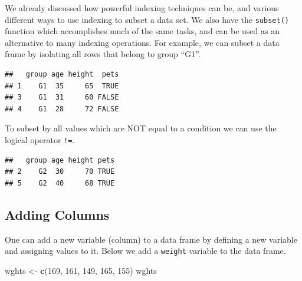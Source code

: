 \documentclass[
]{book}
\newenvironment{Shaded}{\begin{snugshade}}{\end{snugshade}}
\newcommand{\DecValTok}[1]{\textcolor[rgb]{0.00,0.00,0.81}{#1}}
\newcommand{\KeywordTok}[1]{\textcolor[rgb]{0.13,0.29,0.53}{\textbf{#1}}}
\newcommand{\NormalTok}[1]{#1}
\newcommand{\OperatorTok}[1]{\textcolor[rgb]{0.81,0.36,0.00}{\textbf{#1}}}
\newcommand{\StringTok}[1]{\textcolor[rgb]{0.31,0.60,0.02}{#1}}
\begin{document}
We already discussed how powerful indexing techniques can be, and various different ways to use indexing to subset a data set. We also have the \texttt{subset()} function which accomplishes much of the same tasks, and can be used as an alternative to many indexing operations. For example, we can subset a data frame by isolating all rows that belong to group ``G1''.

\begin{Shaded}
\end{Shaded}

\begin{verbatim}
##   group age height  pets
## 1    G1  35     65  TRUE
## 3    G1  31     60 FALSE
## 4    G1  28     72 FALSE
\end{verbatim}

To subset by all values which are NOT equal to a condition we can use the logical operator \texttt{!=}.

\begin{Shaded}
\end{Shaded}

\begin{verbatim}
##   group age height pets
## 2    G2  30     70 TRUE
## 5    G2  40     68 TRUE
\end{verbatim}

\hypertarget{adding-columns}{%
\subsection*{Adding Columns}\label{adding-columns}}

One can add a new variable (column) to a data frame by defining a new variable and assigning values to it. Below we add a \texttt{weight} variable to the data frame.

\begin{Shaded}
\begin{Highlighting}[]
\NormalTok{wghts <-}\StringTok{ }\KeywordTok{c}\NormalTok{(}\DecValTok{169}\NormalTok{, }\DecValTok{161}\NormalTok{, }\DecValTok{149}\NormalTok{, }\DecValTok{165}\NormalTok{, }\DecValTok{155}\NormalTok{)}
\NormalTok{wghts}
\end{Highlighting}
\end{Shaded}
\end{document}
